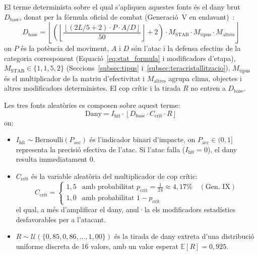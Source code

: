 El terme determinista sobre el qual s'apliquen aquestes fonts és el dany brut $D_{\mathrm{base}}$, donat per la fórmula oficial de combat (Generació~V en endavant)~\cite{smogon_damage,bulbapedia}:
\begin{equation}
    D_{\mathrm{base}} =
    \left\lfloor
    \left(
    \left\lfloor
    \frac{
        \left\lfloor
        (2L/5 + 2) \cdot P \cdot A / D
        \right\rfloor
    }{50}
    \right\rfloor
    + 2
    \right)
    \cdot M_{\mathrm{STAB}} \cdot M_{\mathrm{tipus}} \cdot M_{\mathrm{altres}}
    \right\rfloor
    \label{eq:base_damage}
\end{equation}
on $P$ és la potència del moviment, $A$ i $D$ són l'atac i la defensa efectius de la categoria corresponent (Equació~\ref{eq:stat_formula} i modificadors d'etapa), $M_{\mathrm{STAB}}\in\{1, 1{,}5, 2\}$ (Seccions~\ref{subsec:tipus} i~\ref{subsec:teracristallitzacio}), $M_{\mathrm{tipus}}$ és el multiplicador de la matriu d'efectivitat i $M_{\mathrm{altres}}$ agrupa clima, objectes i altres modificadors deterministes. El cop crític i la tirada $R$ no entren a $D_{\mathrm{base}}$.

Les tres fonts aleatòries es composen sobre aquest terme:
\begin{equation}
    \mathrm{Dany} = I_{\mathrm{hit}} \cdot \left\lfloor D_{\mathrm{base}} \cdot C_{\mathrm{crit}} \cdot R \right\rfloor
    \label{eq:stochastic_damage}
\end{equation}
on:
\begin{itemize}
    \item $I_{\mathrm{hit}} \sim \mathrm{Bernoulli}(P_{\mathrm{acc}})$ és l'indicador binari d'impacte, on $P_{\mathrm{acc}} \in (0, 1]$ representa la precisió efectiva de l'atac. Si l'atac falla ($I_{\mathrm{hit}}=0$), el dany resulta immediatament $0$.
    \item $C_{\mathrm{crit}}$ és la variable aleatòria del multiplicador de cop crític:
          \begin{equation}
              C_{\mathrm{crit}} = \begin{cases}
                  1{,}5 & \text{amb probabilitat } p_{\mathrm{crit}} = \frac{1}{24} \approx 4{,}17\% \quad (\text{Gen.~IX}) \\
                  1{,}0 & \text{amb probabilitat } 1 - p_{\mathrm{crit}}
              \end{cases}
          \end{equation}
          el qual, a més d'amplificar el dany, anul·la els modificadors estadístics desfavorables per a l'atacant.
    \item $R \sim \mathcal{U}(\{0{,}85, 0{,}86, \dots, 1{,}00\})$ és la tirada de dany extreta d'una distribució uniforme discreta de 16 valors, amb un valor esperat $\mathbb{E}[R] = 0{,}925$.
\end{itemize}

